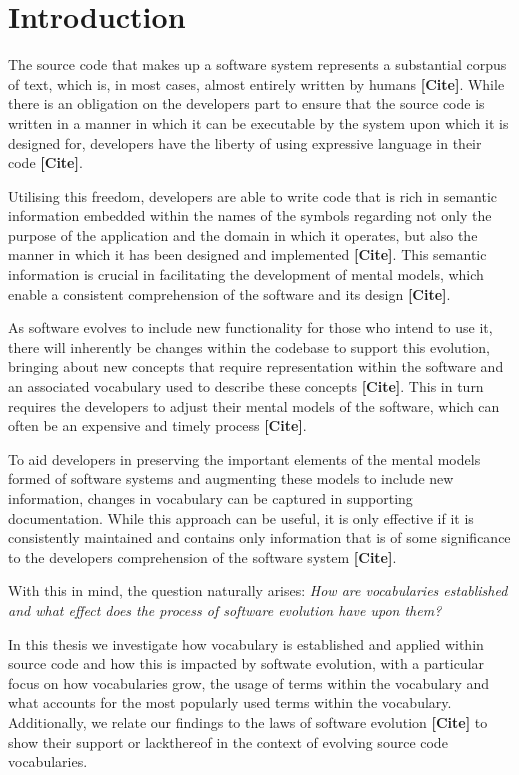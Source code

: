 \chapter{Introduction}
\label{cha:introduction} 

The source code that makes up a software system represents a substantial corpus of text, which is, in most cases, almost entirely written by humans \textbf{[Cite]}. While there is an obligation on the developers part to ensure that the source code is written in a manner in which it can be executable by the system upon which it is designed for, developers have the liberty of using expressive language in their code \textbf{[Cite]}.

Utilising this freedom, developers are able to write code that is rich in semantic information embedded within the names of the symbols regarding not only the purpose of the application and the domain in which it operates, but also the manner in which it has been designed and implemented \textbf{[Cite]}. This semantic information is crucial in facilitating the development of mental models, which enable a consistent comprehension of the software and its design \textbf{[Cite]}.

As software evolves to include new functionality for those who intend to use it, there will inherently be changes within the codebase to support this evolution, bringing about new concepts that require representation within the software and an associated vocabulary used to describe these concepts \textbf{[Cite]}. This in turn requires the developers to adjust their mental models of the software, which can often be an expensive and timely process \textbf{[Cite]}.

To aid developers in preserving the important elements of the mental models formed of software systems and augmenting these models to include new information, changes in vocabulary can be captured in supporting documentation. While this approach can be useful, it is only effective if it is consistently maintained and contains only information that is of some significance to the developers comprehension of the software system \textbf{[Cite]}.

With this in mind, the question naturally arises: \emph{How are vocabularies established and what effect does the process of software evolution have upon them?}

In this thesis we investigate how vocabulary is established and applied within source code and how this is impacted by softwate evolution, with a particular focus on how vocabularies grow, the usage of terms within the vocabulary and what accounts for the most popularly used terms within the vocabulary. Additionally, we relate our findings to the laws of software evolution \textbf{[Cite]} to show their support or lackthereof in the context of evolving source code vocabularies.

